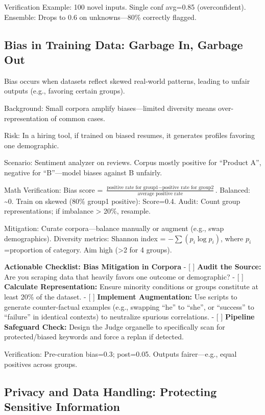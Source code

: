 \documentclass[
]{article}
\begin{document}
Verification Example: 100 novel inputs. Single conf avg=0.85
(overconfident). Ensemble: Drops to 0.6 on unknowns---80\% correctly
flagged.

\subsection{Bias in Training Data: Garbage In, Garbage
Out}\label{bias-in-training-data-garbage-in-garbage-out}

Bias occurs when datasets reflect skewed real-world patterns, leading to
unfair outputs (e.g., favoring certain groups).

Background: Small corpora amplify biases---limited diversity means
over-representation of common cases.

Risk: In a hiring tool, if trained on biased resumes, it generates
profiles favoring one demographic.

Scenario: Sentiment analyzer on reviews. Corpus mostly positive for
``Product A'', negative for ``B''---model biases against B unfairly.

Math Verification: Bias score =
\(\frac{\text{positive rate for group1} - \text{positive rate for group2}}{\text{average positive rate}}\).
Balanced: \textasciitilde0. Train on skewed (80\% group1 positive):
Score=0.4. Audit: Count group representations; if imbalance
\textgreater{} 20\%, resample.

Mitigation: Curate corpora---balance manually or augment (e.g., swap
demographics). Diversity metrics: Shannon index =
\(-\sum (p_i \log p_i)\), where \(p_i\)=proportion of category. Aim high
(\textgreater2 for 4 groups).

\textbf{Actionable Checklist: Bias Mitigation in Corpora} - {[} {]}
\textbf{Audit the Source:} Are you scraping data that heavily favors one
outcome or demographic? - {[} {]} \textbf{Calculate Representation:}
Ensure minority conditions or groups constitute at least 20\% of the
dataset. - {[} {]} \textbf{Implement Augmentation:} Use scripts to
generate counter-factual examples (e.g., swapping ``he'' to ``she'', or
``success'' to ``failure'' in identical contexts) to neutralize spurious
correlations. - {[} {]} \textbf{Pipeline Safeguard Check:} Design the
Judge organelle to specifically scan for protected/biased keywords and
force a replan if detected.

Verification: Pre-curation bias=0.3; post=0.05. Outputs fairer---e.g.,
equal positives across groups.

\subsection{Privacy and Data Handling: Protecting Sensitive
Information}\label{privacy-and-data-handling-protecting-sensitive-information}
\end{document}
